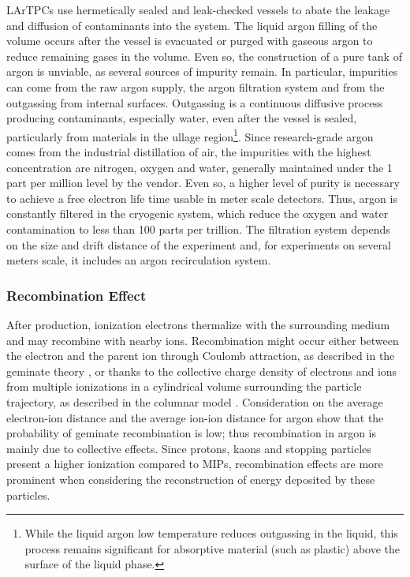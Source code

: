 LArTPCs use  hermetically sealed and leak-checked vessels to abate the leakage and diffusion of contaminants into the system. The liquid argon filling of the volume occurs after the vessel is evacuated or purged with gaseous argon \cite{1748-0221-9-07-P07005} to reduce remaining gases in the volume. Even so, the construction of a pure tank of argon is unviable, as several sources of impurity remain.  In particular, impurities can come from the raw argon supply, the argon filtration system and from the outgassing from internal surfaces. Outgassing is a continuous diffusive process  producing contaminants, especially water, even after the vessel is sealed, particularly from materials in the ullage region\footnote{While the liquid argon low temperature reduces outgassing in the liquid, this process remains significant for absorptive material (such as plastic) above the surface of the liquid phase.}.  Since research-grade argon comes from the industrial distillation of air, the impurities with the highest concentration are nitrogen, oxygen and water, generally maintained under the 1 part per million level by the vendor.  Even so, a higher level of purity is necessary to achieve a free electron life time usable in meter scale detectors. Thus, argon  is constantly  filtered in the cryogenic system, which reduce the oxygen and water contamination to less than 100 parts per trillion. The filtration system depends on the size and drift distance of the experiment and, for experiments on several meters scale, it includes an argon recirculation system.



\subsubsection{Recombination Effect}
After production, ionization electrons thermalize with the surrounding medium and may recombine with nearby ions. Recombination might occur either between the electron and the parent ion through Coulomb attraction, as described in the geminate theory  \cite{PhysRev.54.554}, or thanks to the collective charge density of electrons and ions from multiple ionizations in a cylindrical volume surrounding the particle trajectory, as described in the  columnar model \cite{Jaff1913}. 
Consideration on the  average electron-ion distance and the average ion-ion distance for argon show that the probability of geminate recombination is low; thus recombination in argon is mainly due to collective effects\cite{1748-0221-8-08-P08005}.  Since protons, kaons and stopping particles present a higher ionization compared to MIPs, recombination effects are more prominent when considering the reconstruction of energy deposited by these particles.

